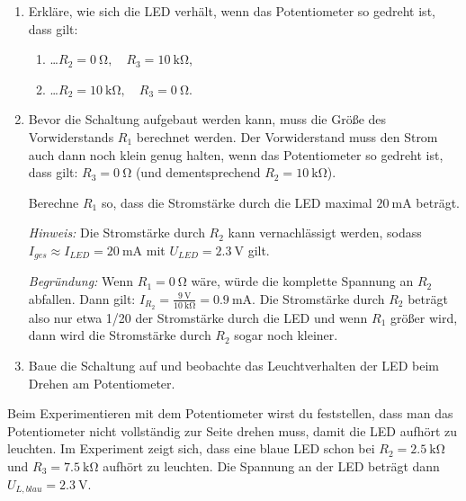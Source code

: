 \begin{projekt}\label{proj:dimmlampeomc}
	\vspace{-0.5\baselineskip}
	\begin{enumerate}[label=\alph*), itemsep=0mm, parsep=0mm]
		\item Erkläre, wie sich die LED verhält, wenn das Potentiometer so gedreht ist, dass gilt:
		\begin{enumerate}[label=(\arabic*), itemsep=0mm, parsep=0mm]
			\item \dots $R_2=\SI{0}{\ohm}, \quad R_3=\SI{10}{\kilo\ohm}$,
			\item \dots $R_2=\SI{10}{\kilo\ohm}, \quad R_3=\SI{0}{\ohm}$.
		\end{enumerate} 
		\item Bevor die Schaltung aufgebaut werden kann, muss die Größe des Vorwiderstands $R_1$ berechnet werden. Der Vorwiderstand muss den Strom auch dann noch klein genug halten, wenn das Potentiometer so gedreht ist, dass gilt: $R_3=\SI{0}{\ohm}$ (und dementsprechend $R_2=\SI{10}{\kilo\ohm}$).
		
		Berechne $R_1$ so, dass die Stromstärke durch die LED maximal $\SI{20}{\milli\ampere}$ beträgt.
		
		\emph{Hinweis:} Die Stromstärke durch $R_2$ kann vernachlässigt werden, sodass $I_{ges}\approx I_{LED} = \SI{20}{\milli\ampere}$ mit $U_{LED}=\SI{2,3}{\volt}$ gilt.
		
		\emph{Begründung:} Wenn $R_1=\SI{0}{\ohm}$ wäre, würde die komplette Spannung an $R_2$ abfallen. Dann gilt: $I_{R_2}=\frac{\SI{9}{\volt}}{\SI{10}{\kilo\ohm}}=\SI{0,9}{\milli\ampere}$. Die Stromstärke durch $R_2$ beträgt also nur etwa 1/20 der Stromstärke durch die LED und wenn $R_1$ größer wird, dann wird die Stromstärke durch $R_2$ sogar noch kleiner. 
		
		\item Baue die Schaltung auf und beobachte das Leuchtverhalten der LED beim Drehen am Potentiometer.
	\end{enumerate}
\end{projekt}

\newpage
Beim Experimentieren mit dem Potentiometer wirst du feststellen, dass man das Potentiometer nicht vollständig zur Seite drehen muss, damit die LED aufhört zu leuchten. Im Experiment zeigt sich, dass eine blaue LED schon bei $R_2=\SI{2,5}{\kilo\ohm}$ und $R_3=\SI{7,5}{\kilo\ohm}$ aufhört zu leuchten. Die Spannung an der LED beträgt dann $U_{L,blau}=\SI{2,3}{\volt}$.

